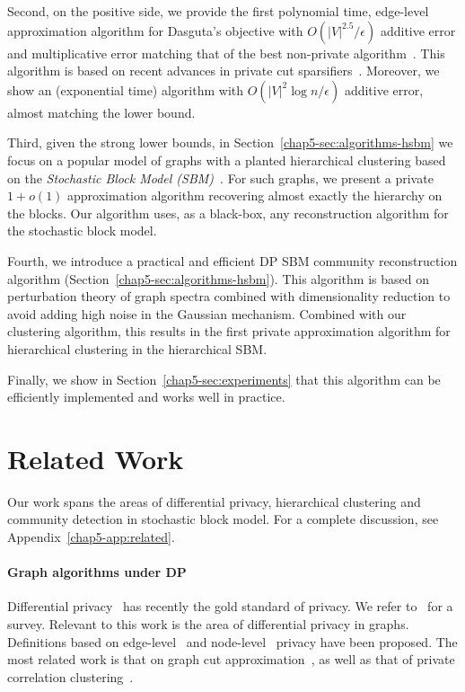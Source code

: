 Second, on the positive side, we provide the first polynomial time, edge-level approximation algorithm for Dasguta's objective with $ O(|V|^{2.5} /\epsilon)$ additive error and multiplicative error matching that of the best non-private algorithm~\citep{agarwal2022sublinear}. This algorithm is based on recent advances in private cut sparsifiers~\citep{eliavs2020differentially}. Moreover, we show an (exponential time) algorithm with $O(|V|^{2} \log n/ \epsilon)$ additive error, almost matching the lower bound.

Third, given the strong lower bounds, in Section~\ref{chap5-sec:algorithms-hsbm} we focus on a popular model of graphs with a planted hierarchical clustering based on the {\em Stochastic Block Model (SBM)}~\citep{cohen2017hierarchical}. For such graphs, we present a private $1+o(1)$ approximation algorithm recovering almost exactly the hierarchy on the blocks. Our algorithm uses, as a black-box, any reconstruction algorithm for the stochastic block model. 

Fourth, we introduce a practical and efficient DP SBM community reconstruction algorithm (Section~\ref{chap5-sec:algorithms-hsbm}). This algorithm is based on perturbation theory of graph spectra combined with dimensionality reduction to avoid adding high noise in the Gaussian mechanism. Combined with our clustering algorithm, this results in the first private approximation algorithm for hierarchical clustering in the hierarchical SBM. 

Finally, we show in Section~\ref{chap5-sec:experiments} that this algorithm can be efficiently implemented and works well in practice.

\section{Related Work}
\label{chap5-sec:related}

Our work spans the areas of differential privacy, hierarchical clustering and community detection in stochastic block model. For a complete discussion, see Appendix~\ref{chap5-app:related}.

\paragraph{Graph algorithms under DP}
Differential privacy~\citep{dwork2006calibrating} has recently the gold standard of privacy. We refer to~\citet{DP} for a survey. Relevant to this work is the area of differential privacy in graphs. Definitions based on edge-level~\citep{epasto2022differentially,eliavs2020differentially} and node-level~\citep{Kasiviswanathan_TCC13} privacy have been proposed. The most related work is that on graph cut approximation~\citep{eliavs2020differentially,arora2019differentially}, as well as that of private correlation clustering~\citep{bun2021differentially, cohen2022near}.

